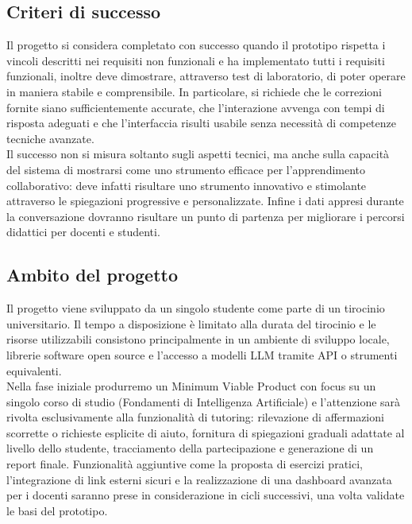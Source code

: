 \documentclass[a4paper,9pt]{article}
\begin{document}
	\subsection{Criteri di successo}
		
	Il progetto si considera completato con successo quando il prototipo rispetta i vincoli descritti nei requisiti non funzionali e ha implementato tutti i requisiti funzionali, inoltre deve dimostrare, attraverso test di laboratorio, di poter operare in maniera stabile e comprensibile. 
	In particolare, si richiede che le correzioni fornite siano sufficientemente accurate, che l’interazione avvenga con tempi di risposta adeguati e che l’interfaccia risulti usabile senza necessità di competenze tecniche avanzate.\\ 
	Il successo non si misura soltanto sugli aspetti tecnici, ma anche sulla capacità del sistema di mostrarsi come uno strumento efficace per l’apprendimento collaborativo: deve infatti risultare uno strumento innovativo e stimolante attraverso le spiegazioni progressive e personalizzate. Infine i dati appresi durante la conversazione dovranno risultare un punto di partenza per migliorare i percorsi didattici per docenti e studenti.
	
	\subsection{Ambito del progetto}
	Il progetto viene sviluppato da un singolo studente come parte di un tirocinio universitario. Il tempo a disposizione è limitato alla durata del tirocinio e le risorse utilizzabili consistono principalmente in un ambiente di sviluppo locale, librerie software open source e l’accesso a modelli LLM tramite API o strumenti equivalenti. \\
	Nella fase iniziale produrremo un Minimum Viable Product con focus su un singolo corso di studio (Fondamenti di Intelligenza Artificiale) e l’attenzione sarà rivolta esclusivamente alla funzionalità di tutoring: rilevazione di affermazioni scorrette o richieste esplicite di aiuto, fornitura di spiegazioni graduali adattate al livello dello studente, tracciamento della partecipazione e generazione di un report finale. 
	Funzionalità aggiuntive come la proposta di esercizi pratici, l’integrazione di link esterni sicuri e la realizzazione di una dashboard avanzata per i docenti saranno prese in considerazione in cicli successivi, una volta validate le basi del prototipo.
	
\end{document}
